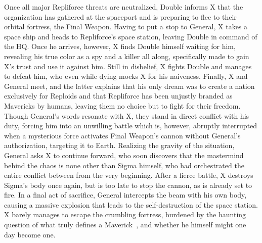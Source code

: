 Once all major Repliforce threats are neutralized, Double informs X that the organization has gathered at the spaceport and is preparing to flee to their orbital fortress, the Final Weapon.  Having to put a stop to General, X takes a space ship and heads to Repliforce's space station, leaving Double in command of the HQ. Once he arrives, however, X finds Double himself waiting for him, revealing his true color as a spy and a killer all along, specifically made to gain X's trust and use it against him. Still in disbelief, X fights Double and manages to defeat him, who even while dying mocks X for his naiveness. Finally, X and General meet, and the latter explains that his only dream was to create a nation exclusively for Reploids and that Repliforce has been unjustly branded as Mavericks by humans, leaving them no choice but to fight for their freedom. Though General’s words resonate with X, they stand in direct conflict with his duty, forcing him into an unwilling battle which is, however, abruptly interrupted when a mysterious force activates Final Weapon’s cannon without General’s authorization, targeting it to Earth. Realizing the gravity of the situation, General asks X to continue forward,  who soon discovers that the mastermind behind the chaos is none other than Sigma himself, who had orchestrated the entire conflict between from the very beginning. After a fierce battle, X destroys Sigma’s body once again, but is too late to stop the cannon, as is already set to fire. In a final act of sacrifice, General intercepts the beam with his own body, causing a massive explosion that leads to the self-destruction of the space station. X barely manages to escape the crumbling fortress, burdened by the haunting question of what truly defines a Maverick~\cite{wordpress:X4_japanese_script_X}, and whether he himself might one day become one.
